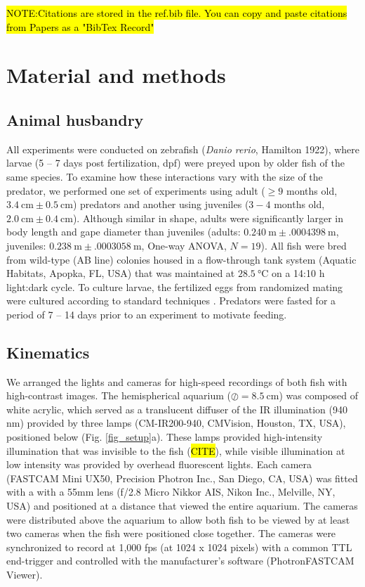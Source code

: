 \documentclass[]{rsos}%
\begin{document}
\hl{NOTE:Citations are stored in the ref.bib file.  You can copy and paste citations from Papers as a "BibTex Record"}

\section{Material and methods}

\subsection{Animal husbandry}
All experiments were conducted on zebrafish (\textit{Danio rerio}, Hamilton 1922), where larvae (5 -- 7 days post fertilization, dpf) were preyed upon by older fish of the same species. 
To examine how these interactions vary with the size of the predator, we performed one set of experiments using adult ($\geq 9$ months old, $\SI{3.4}{\cm} \pm \SI{0.5}{\cm}$) predators and another using juveniles  ($3-4$ months old, $\SI{2.0}{\cm}  \pm  \SI{0.4}{\cm}$). 
Although similar in shape, adults were significantly larger in body length and gape diameter than juveniles (adults: $\SI{0.240}{\m} \pm \SI{.0004398}{\m}$, juveniles: $\SI{0.238}{\m} \pm \SI{.0003058}{\m}$, One-way ANOVA, $N = 19$).
All fish were bred from wild-type (AB line) colonies housed in a flow-through tank system (Aquatic Habitats, Apopka, FL, USA) that was maintained at $\SI{28.5}{\celsius}$ on a 14:10 h light:dark cycle. 
To culture larvae, the fertilized eggs from randomized mating were cultured according to standard techniques \cite{Westerfield:UXiBrEuA}.
Predators were fasted for a period of 7 -- 14 days prior to an experiment to motivate feeding.


\subsection{Kinematics}
We arranged the lights and cameras for high-speed recordings of both fish with high-contrast images. 
The hemispherical aquarium ($\oslash = \SI{8.5}{\cm}$) was composed of white acrylic, which served as a translucent diffuser of the IR illumination (940 nm) provided by three lamps (CM-IR200-940, CMVision, Houston, TX, USA), positioned below (Fig. \ref{fig_setup}a). 
These lamps provided high-intensity illumination that was invisible to the fish (\hl{CITE}), while visible illumination at low intensity was provided by overhead fluorescent lights.
Each camera (FASTCAM Mini UX50, Precision Photron Inc., San Diego, CA, USA) was fitted with a with a 55mm lens (f/2.8 Micro Nikkor AIS, Nikon Inc., Melville, NY, USA) and positioned at a distance that viewed the entire aquarium. 
The cameras were distributed above the aquarium to allow both fish to be viewed by at least two cameras when the fish were positioned close together.
The cameras were synchronized to record at 1,000 fps (at 1024 x 1024 pixels) with a common TTL end-trigger and controlled with the manufacturer's software (PhotronFASTCAM Viewer).
\end{document}

